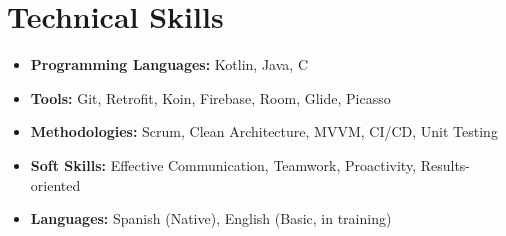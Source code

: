 \documentclass[11pt,a4paper]{article}
\begin{document}
\section{Technical Skills}

\begin{itemize}[leftmargin=*]
    \item \textbf{Programming Languages:} Kotlin, Java, C
    \item \textbf{Tools:} Git, Retrofit, Koin, Firebase, Room, Glide, Picasso
    \item \textbf{Methodologies:} Scrum, Clean Architecture, MVVM, CI/CD, Unit Testing
    \item \textbf{Soft Skills:} Effective Communication, Teamwork, Proactivity, Results-oriented
    \item \textbf{Languages:} Spanish (Native), English (Basic, in training)
\end{itemize}
\end{document}

